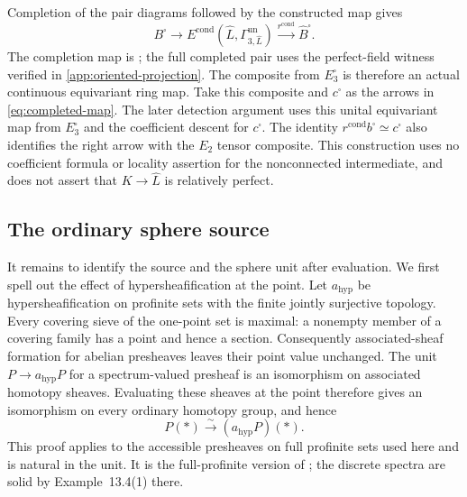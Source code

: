 Completion of the pair diagrams followed by the constructed map gives
\[
 B^\square\longrightarrow
 E^{\mathrm{cond}}(\widehat L,\Gamma^{\mathrm{un}}_{3,\widehat L})
 \xrightarrow{r^{\mathrm{cond}}}\widehat B^\square.
\]
The completion map is \cite[Example~4.6.4]{BMR2026}; the full completed
pair uses the perfect-field witness verified in
\cref{app:oriented-projection}. The composite from \(E_3^\square\)
is therefore an actual continuous equivariant ring map. Take this
composite and \(c^\square\) as the arrows in \eqref{eq:completed-map}.
The later detection argument uses this unital equivariant map from
\(E_3^\square\) and the coefficient descent for \(c^\square\).
The identity \(r^{\mathrm{cond}}b^\square\simeq c^\square\) also
identifies the right arrow with the \(E_2\) tensor composite.
This construction uses no coefficient formula
or locality assertion for the nonconnected intermediate, and does not
assert that \(K\to\widehat L\) is relatively perfect.

\subsection{The ordinary sphere source}

It remains to identify the source and the sphere unit after evaluation.
We first spell out the effect of hypersheafification at the point. Let \(a_{\mathrm{hyp}}\) be
hypersheafification on profinite sets with the finite jointly surjective
topology. Every covering sieve of the one-point set is maximal: a
nonempty member of a covering family has a point and hence a section.
Consequently associated-sheaf formation for abelian presheaves leaves
their point value unchanged. The unit
\(P\to a_{\mathrm{hyp}}P\) for a spectrum-valued presheaf is an
isomorphism on associated homotopy sheaves. Evaluating these sheaves at
the point therefore gives an isomorphism on every ordinary homotopy
group, and hence
\[
 P(*)\xrightarrow{\sim}(a_{\mathrm{hyp}}P)(*).
\]
This proof applies to the accessible presheaves on full profinite sets
used here and is natural in the unit. It is the full-profinite version of
\cite[Lemma~13.5 and Remark~13.6]{Clausen2025}; the discrete spectra are
solid by Example~13.4(1) there.

